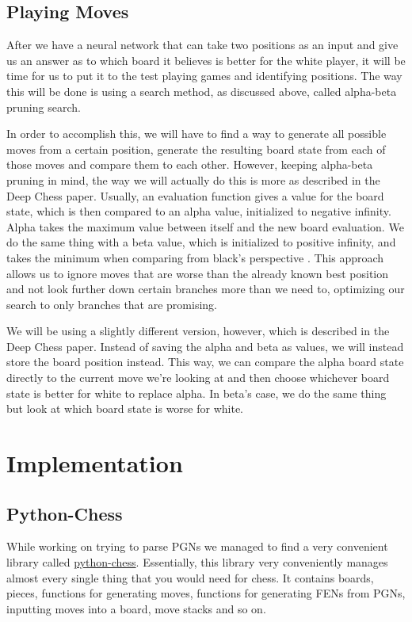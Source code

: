 \documentclass[12pt]{article}
\begin{document}
    \subsection{Playing Moves}

    After we have a neural network that can take two positions as an input and give us an answer as to which board it believes is better for the white player, it will be time for us to put it to the test playing games and identifying positions. The way this will be done is using a search method, as discussed above, called alpha-beta pruning search. 

    In order to accomplish this, we will have to find a way to generate all possible moves from a certain position, generate the resulting board state from each of those moves and compare them to each other. However, keeping alpha-beta pruning in mind, the way we will actually do this is more as described in the Deep Chess paper. Usually, an evaluation function gives a value for the board state, which is then compared to an alpha value, initialized to negative infinity. Alpha takes the maximum value between itself and the new board evaluation. We do the same thing with a beta value, which is initialized to positive infinity, and takes the minimum when comparing from black's perspective \cite{deepchess}. This approach allows us to ignore moves that are worse than the already known best position and not look further down certain branches more than we need to, optimizing our search to only branches that are promising. 

    We will be using a slightly different version, however, which is described in the Deep Chess paper. Instead of saving the alpha and beta as values, we will instead store the board position instead. This way, we can compare the alpha board state directly to the current move we're looking at and then choose whichever board state is better for white to replace alpha. In beta's case, we do the same thing but look at which board state is worse for white. 
    
    \section{Implementation}

    \subsection{Python-Chess}

    While working on trying to parse PGNs we managed to find a very convenient library called \href{https://python-chess.readthedocs.io/en/latest/}{python-chess}. Essentially, this library very conveniently manages almost every single thing that you would need for chess. It contains boards, pieces, functions for generating moves, functions for generating FENs from PGNs, inputting moves into a board, move stacks and so on.
\end{document}
